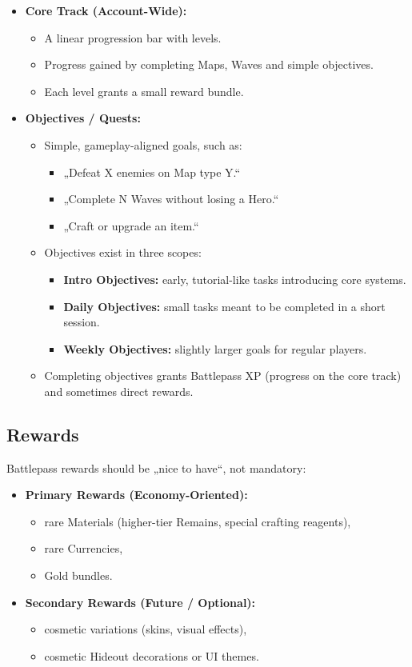 \begin{itemize}
	\item \textbf{Core Track (Account-Wide):}
	\begin{itemize}
		\item A linear progression bar with levels.
		\item Progress gained by completing Maps, Waves and simple objectives.
		\item Each level grants a small reward bundle.
	\end{itemize}
	\item \textbf{Objectives / Quests:}
	\begin{itemize}
		\item Simple, gameplay-aligned goals, such as:
		\begin{itemize}
			\item „Defeat X enemies on Map type Y.“
			\item „Complete N Waves without losing a Hero.“
			\item „Craft or upgrade an item.“
		\end{itemize}
		\item Objectives exist in three scopes:
		\begin{itemize}
			\item \textbf{Intro Objectives:} early, tutorial-like tasks introducing core systems.
			\item \textbf{Daily Objectives:} small tasks meant to be completed in a short session.
			\item \textbf{Weekly Objectives:} slightly larger goals for regular players.
		\end{itemize}
		\item Completing objectives grants Battlepass XP (progress on the core track) and sometimes direct rewards.
	\end{itemize}
\end{itemize}

\subsection{Rewards}

Battlepass rewards should be „nice to have“, not mandatory:

\begin{itemize}
	\item \textbf{Primary Rewards (Economy-Oriented):}
	\begin{itemize}
		\item rare Materials (higher-tier Remains, special crafting reagents),
		\item rare Currencies,
		\item Gold bundles.
	\end{itemize}
	\item \textbf{Secondary Rewards (Future / Optional):}
	\begin{itemize}
		\item cosmetic variations (skins, visual effects),
		\item cosmetic Hideout decorations or UI themes.
	\end{itemize}
\end{itemize}

